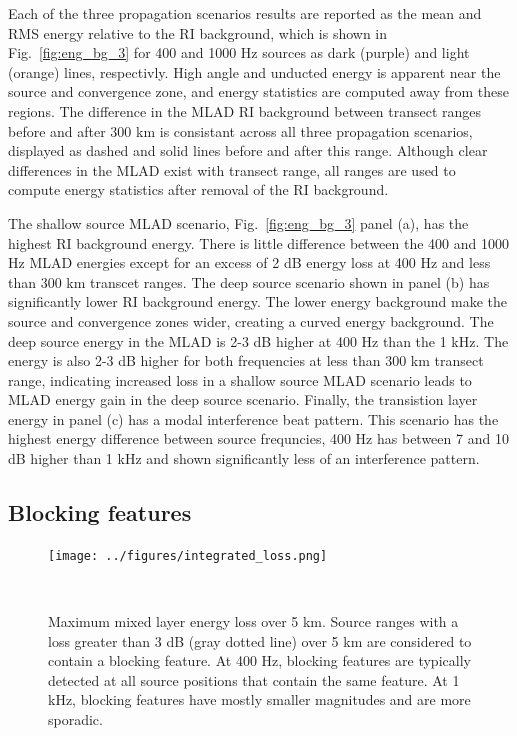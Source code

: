 \documentclass[preprint,NumberedRefs]{JASA}
\begin{document}
Each of the three propagation scenarios results are reported as the mean and RMS energy relative to the RI background, which is shown in Fig.~\ref{fig:eng_bg_3} for 400 and 1000 Hz sources as dark (purple) and light (orange) lines, respectivly. High angle and unducted energy is apparent near the source and convergence zone, and energy statistics are computed away from these regions. The difference in the MLAD RI background between transect ranges before and after 300 km is consistant across all three propagation scenarios, displayed as dashed and solid lines before and after this range. Although clear differences in the MLAD exist with transect range, all ranges are used to compute energy statistics after removal of the RI background.

The shallow source MLAD scenario, Fig.~\ref{fig:eng_bg_3} panel (a), has the highest RI background energy. There is little difference between the 400 and 1000 Hz MLAD energies except for an excess of 2 dB energy loss at 400 Hz and less than 300 km transcet ranges. The deep source scenario shown in panel (b) has significantly lower RI background energy. The lower energy background make the source and convergence zones wider, creating a curved energy background. The deep source energy in the MLAD is 2-3 dB higher at 400 Hz than the 1 kHz. The energy is also 2-3 dB higher for both frequencies at less than 300 km transect range, indicating increased loss in a shallow source MLAD scenario leads to MLAD energy gain in the deep source scenario. Finally, the transistion layer energy in panel (c) has a modal interference beat pattern. This scenario has the highest energy difference between source frequncies, 400 Hz has between 7 and 10 dB higher than 1 kHz and shown significantly less of an interference pattern.

\subsection{Blocking features}\label{ssec:blocking}
\begin{figure}
\texttt{[image: ../figures/integrated\_loss.png]}
    \caption{Maximum mixed layer energy loss over 5 km. Source ranges with a loss greater than 3 dB (gray dotted line) over 5 km are considered to contain a blocking feature. At 400 Hz, blocking features are typically detected at all source positions that contain the same feature. At 1 kHz, blocking features have mostly smaller magnitudes and are more sporadic.}
    \label{fig:blocking}
\end{figure}
\end{document}
